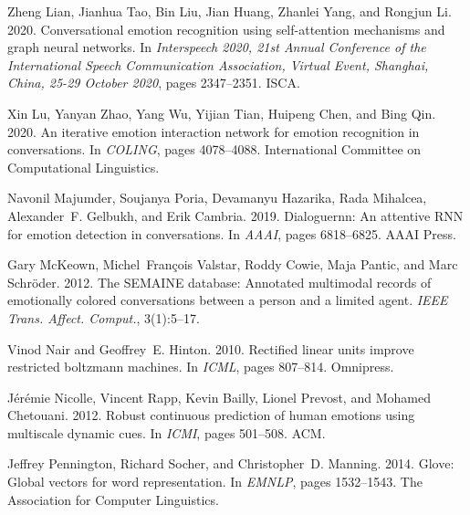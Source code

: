 \documentclass[11pt,a4paper]{article}
\begin{document}
\begin{thebibliography}{45}
  Zheng Lian, Jianhua Tao, Bin Liu, Jian Huang, Zhanlei Yang, and Rongjun Li.
    2020.
  \newblock Conversational emotion recognition using self-attention mechanisms
    and graph neural networks.
  \newblock In \emph{Interspeech 2020, 21st Annual Conference of the
    International Speech Communication Association, Virtual Event, Shanghai,
    China, 25-29 October 2020}, pages 2347--2351. {ISCA}.
  
  Xin Lu, Yanyan Zhao, Yang Wu, Yijian Tian, Huipeng Chen, and Bing Qin. 2020.
  \newblock An iterative emotion interaction network for emotion recognition in
    conversations.
  \newblock In \emph{{COLING}}, pages 4078--4088. International Committee on
    Computational Linguistics.
  
  Navonil Majumder, Soujanya Poria, Devamanyu Hazarika, Rada Mihalcea,
    Alexander~F. Gelbukh, and Erik Cambria. 2019.
  \newblock Dialoguernn: An attentive {RNN} for emotion detection in
    conversations.
  \newblock In \emph{{AAAI}}, pages 6818--6825. {AAAI} Press.
  
  Gary McKeown, Michel~Fran{\c{c}}ois Valstar, Roddy Cowie, Maja Pantic, and Marc
    Schr{\"{o}}der. 2012.
  \newblock The {SEMAINE} database: Annotated multimodal records of emotionally
    colored conversations between a person and a limited agent.
  \newblock \emph{{IEEE} Trans. Affect. Comput.}, 3(1):5--17.
  
  Vinod Nair and Geoffrey~E. Hinton. 2010.
  \newblock Rectified linear units improve restricted boltzmann machines.
  \newblock In \emph{{ICML}}, pages 807--814. Omnipress.
  
  J{\'{e}}r{\'{e}}mie Nicolle, Vincent Rapp, Kevin Bailly, Lionel Prevost, and
    Mohamed Chetouani. 2012.
  \newblock Robust continuous prediction of human emotions using multiscale
    dynamic cues.
  \newblock In \emph{{ICMI}}, pages 501--508. {ACM}.
  
  Jeffrey Pennington, Richard Socher, and Christopher~D. Manning. 2014.
  \newblock Glove: Global vectors for word representation.
  \newblock In \emph{{EMNLP}}, pages 1532--1543. The Association for Computer
    Linguistics.
  

\end{thebibliography}
\end{document}
